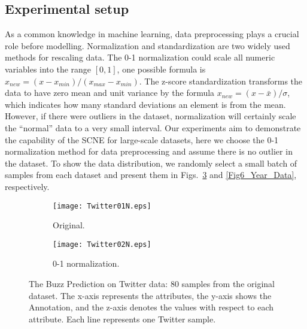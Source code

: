 \documentclass{article}
\begin{document}
\subsection{Experimental setup} 
As a common knowledge in machine learning, data preprocessing plays a crucial role before modelling. 
Normalization and standardization are two widely used methods for rescaling data.
The 0-1 normalization could scale all numeric variables into the range $[0,1]$, one possible formula is $x_{new} = (x- x_{min} ) / (x_{max}-x_{min})$. 
The z-score standardization transforms the data to have zero mean and unit variance by the formula $x_{new} = (x-\bar{x})/ \sigma $, which indicates how many standard deviations an element is from the mean. However, if there were outliers in the dataset, normalization will certainly scale the “normal” data to a very small interval. Our experiments aim to demonstrate the capability of the SCNE for large-scale datasets, here  we choose  the 0-1 normalization method for data preprocessing and assume there is no outlier in the dataset. To show the data distribution, we randomly select a small batch of samples from each dataset and present them in Figs.~\ref{Fig5_Twitter_Data} and \ref{Fig6_Year_Data}, respectively.
\begin{figure}[!h]
\centering
    \begin{subfigure}[b]{0.49\textwidth}
        \texttt{[image: Twitter01N.eps]}
        \caption{Original.}
        \label{Fig05a: Twitter_Original}    
    \end{subfigure}
    \begin{subfigure}[b]{0.49\textwidth}
    \texttt{[image: Twitter02N.eps]}
    \caption{0-1 normalization.}
    \label{Fig05b: Twitter_Zscore}    
    \end{subfigure}    
\caption{The Buzz Prediction on Twitter data: 80 samples from the original dataset. The x-axis represents the attributes, the y-axis shows the Annotation, and the z-axis denotes the values with respect to each attribute. Each line represents one Twitter sample.}
\label{Fig5_Twitter_Data}
\end{figure} 
\end{document}
